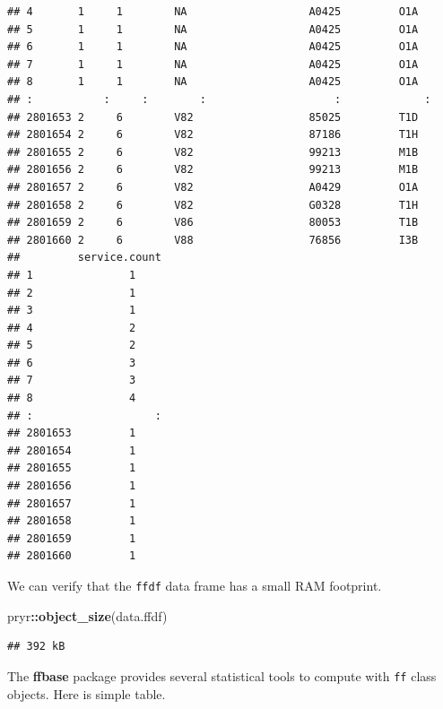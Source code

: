 \documentclass[]{book}
\newenvironment{Shaded}{\begin{snugshade}}{\end{snugshade}}
\newcommand{\KeywordTok}[1]{\textcolor[rgb]{0.13,0.29,0.53}{\textbf{#1}}}
\newcommand{\NormalTok}[1]{#1}
\newcommand{\OperatorTok}[1]{\textcolor[rgb]{0.81,0.36,0.00}{\textbf{#1}}}
\theoremstyle{definition}
\theoremstyle{definition}
\theoremstyle{definition}
\theoremstyle{remark}
\begin{document}
\begin{verbatim}
## 4       1     1        NA                   A0425         O1A  
## 5       1     1        NA                   A0425         O1A  
## 6       1     1        NA                   A0425         O1A  
## 7       1     1        NA                   A0425         O1A  
## 8       1     1        NA                   A0425         O1A  
## :           :     :        :                    :             :
## 2801653 2     6        V82                  85025         T1D  
## 2801654 2     6        V82                  87186         T1H  
## 2801655 2     6        V82                  99213         M1B  
## 2801656 2     6        V82                  99213         M1B  
## 2801657 2     6        V82                  A0429         O1A  
## 2801658 2     6        V82                  G0328         T1H  
## 2801659 2     6        V86                  80053         T1B  
## 2801660 2     6        V88                  76856         I3B  
##         service.count
## 1               1    
## 2               1    
## 3               1    
## 4               2    
## 5               2    
## 6               3    
## 7               3    
## 8               4    
## :                   :
## 2801653         1    
## 2801654         1    
## 2801655         1    
## 2801656         1    
## 2801657         1    
## 2801658         1    
## 2801659         1    
## 2801660         1
\end{verbatim}

We can verify that the \texttt{ffdf} data frame has a small RAM footprint.

\begin{Shaded}
\begin{Highlighting}[]
\NormalTok{pryr}\OperatorTok{::}\KeywordTok{object_size}\NormalTok{(data.ffdf)}
\end{Highlighting}
\end{Shaded}

\begin{verbatim}
## 392 kB
\end{verbatim}

The \textbf{ffbase} package provides several statistical tools to compute with \texttt{ff} class objects.
Here is simple table.

\begin{Shaded}
\end{Shaded}
\end{document}
